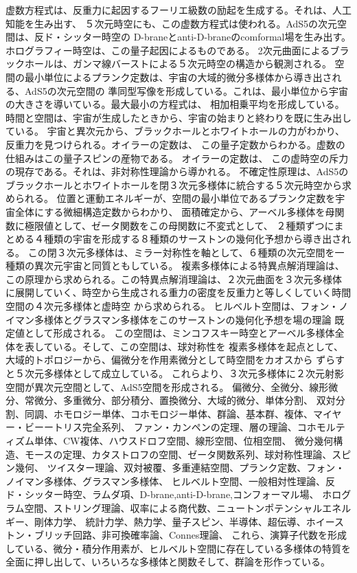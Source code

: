 \documentclass{jsarticle}
\begin{document}
   虚数方程式は、反重力に起因するフーリエ級数の励起を生成する。それは、人工知能を生み出す、
   ５次元時空にも、この虚数方程式は使われる。AdS5の次元空間は、反ド・シッター時空の
   D-braneとanti-D-braneのcomformal場を生み出す。ホログラフィー時空は、この量子起因によるものである。
   2次元曲面によるブラックホールは、ガンマ線バーストによる５次元時空の構造から観測される。
   空間の最小単位によるプランク定数は、宇宙の大域的微分多様体から導き出される、AdS5の次元空間の
   準同型写像を形成している。これは、最小単位から宇宙の大きさを導いている。最大最小の方程式は、
   相加相乗平均を形成している。時間と空間は、宇宙が生成したときから、宇宙の始まりと終わりを既に生み出している。
   宇宙と異次元から、ブラックホールとホワイトホールの力がわかり、反重力を見つけられる。オイラーの定数は、
   この量子定数からわかる。虚数の仕組みはこの量子スピンの産物である。
   オイラーの定数は、 この虚時空の斥力の現存である。それは、非対称性理論から導かれる。
   不確定性原理は、AdS5のブラックホールとホワイトホールを閉３次元多様体に統合する５次元時空から求められる。
   位置と運動エネルギーが、空間の最小単位であるプランク定数を宇宙全体にする微細構造定数からわかり、
   面積確定から、アーベル多様体を母関数に極限値として、ゼータ関数をこの母関数に不変式として、
   ２種類ずつにまとめる４種類の宇宙を形成する８種類のサーストンの幾何化予想から導き出される。
   この閉３次元多様体は、ミラー対称性を軸として、６種類の次元空間を一種類の異次元宇宙と同質ともしている。
   複素多様体による特異点解消理論は、この原理から求められる。この特異点解消理論は、２次元曲面を３次元多様体
   に展開していく、時空から生成される重力の密度を反重力と等しくしていく時間空間の４次元多様体と虚時空
   から求められる。
   ヒルベルト空間は、フォン・ノイマン多様体とグラスマン多様体をこのサーストンの幾何化予想を場の理論
   既定値として形成される。
   この空間は、ミンコフスキー時空とアーベル多様体全体を表している。そして、この空間は、球対称性を
   複素多様体を起点として、大域的トポロジーから、偏微分を作用素微分として時空間をカオスから
   ずらすと５次元多様体として成立している。
   これらより、３次元多様体に２次元射影空間が異次元空間として、AdS5空間を形成される。
   偏微分、全微分、線形微分、常微分、多重微分、部分積分、置換微分、大域的微分、単体分割、
   双対分割、同調、ホモロジー単体、コホモロジー単体、群論、基本群、複体、マイヤー・ビーートリス完全系列、
   ファン・カンペンの定理、層の理論、コホモルティズム単体、CW複体、ハウスドロフ空間、線形空間、位相空間、
   微分幾何構造、モースの定理、カタストロフの空間、ゼータ関数系列、球対称性理論、スピン幾何、
   ツイスター理論、双対被覆、多重連結空間、プランク定数、フォン・ノイマン多様体、グラスマン多様体、
   ヒルベルト空間、一般相対性理論、反ド・シッター時空、ラムダ項、D-brane,anti-D-brane,コンフォーマル場、
   ホログラム空間、ストリング理論、収率による商代数、ニュートンポテンシャルエネルギー、剛体力学、
   統計力学、熱力学、量子スピン、半導体、超伝導、ホイーストン・ブリッチ回路、非可換確率論、Connes理論、
   これら、演算子代数を形成している、微分・積分作用素が、ヒルベルト空間に存在している多様体の特質を
   全面に押し出して、いろいろな多様体と関数そして、群論を形作っている。
\end{document}
